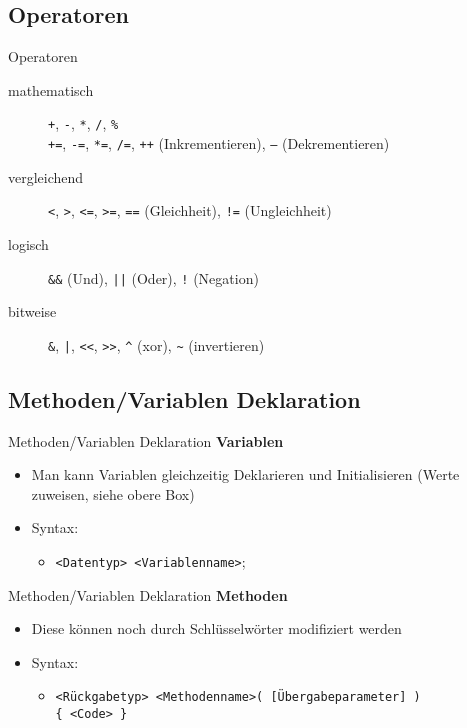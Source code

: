 \subsection{Operatoren}
\begin{frame}{Operatoren}
	\begin{description}
	    \item[mathematisch] \alert{\texttt{+}}, \alert{\texttt{-}}, \alert{\texttt{*}}, \alert{\texttt{/}}, 						\alert{\texttt{\%}}\\
	    \alert{\texttt{+=}}, \alert{\texttt{-=}}, \alert{\texttt{*=}}, \alert{\texttt{/=}}, \alert{\texttt{++}} (Inkrementieren), \alert{\texttt{--}} (Dekrementieren)
	    \item[vergleichend] \alert{\texttt{<}}, \alert{\texttt{>}}, \alert{\texttt{<=}}, \alert{\texttt{>=}}, \alert{\texttt{==}} (Gleichheit), \alert{\texttt{!=}} (Ungleichheit)
	    \item[logisch] \alert{\texttt{\&\&}} (Und), \alert{\texttt{||}} (Oder), \alert{\texttt{!}} (Negation)
	    \item[bitweise] \alert{\texttt{\&}}, \alert{\texttt{|}}, \alert{\texttt{<<}}, \alert{\texttt{>>}}, \alert{\texttt{\^}} (xor), \alert{\texttt{\~}} (invertieren)
	\end{description}
\end{frame}

\subsection{Methoden/Variablen Deklaration}
\begin{frame}{Methoden/Variablen Deklaration}
	\textbf{Variablen}\\
		\begin{itemize}
			\item Man kann Variablen gleichzeitig Deklarieren und Initialisieren (Werte zuweisen, siehe obere Box)
			\item Syntax:
			\begin{itemize}			
				\item \alert{\texttt{<Datentyp> <Variablenname>};}
			\end{itemize}
		\end{itemize}
	
\end{frame}

\begin{frame}{Methoden/Variablen Deklaration}
	\textbf{Methoden}\\
	\begin{itemize}
		\item Diese können noch durch Schlüsselwörter modifiziert werden
		\item Syntax:
		\begin{itemize}			
			\item \texttt{\alert{<Rückgabetyp> <Methodenname>}( \alert{[Übergabeparameter]} ) \\ \{ \alert{<Code>} \}}
		\end{itemize}
	\end{itemize}		
	
\end{frame}


